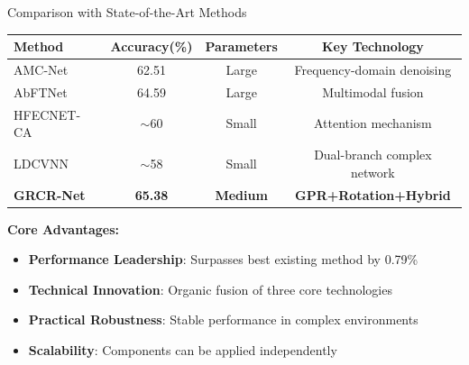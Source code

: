 \documentclass[aspectratio=169]{beamer}
\begin{document}
\begin{frame}{Comparison with State-of-the-Art Methods}
\begin{table}[h]
\centering
\scriptsize
\begin{tabular}{@{}lccc@{}}
\toprule
\textbf{Method} & \textbf{Accuracy(\%)} & \textbf{Parameters} & \textbf{Key Technology} \\
\midrule
AMC-Net & 62.51 & Large & Frequency-domain denoising \\
AbFTNet & 64.59 & Large & Multimodal fusion \\
HFECNET-CA & $\sim$60 & Small & Attention mechanism \\
LDCVNN & $\sim$58 & Small & Dual-branch complex network \\
\midrule
\textcolor{zjutred}{\textbf{GRCR-Net}} & \textcolor{zjutred}{\textbf{65.38}} & \textcolor{zjutred}{\textbf{Medium}} & \textcolor{zjutred}{\textbf{GPR+Rotation+Hybrid}} \\
\bottomrule
\end{tabular}
\end{table}

\vspace{0.5cm}
\textbf{Core Advantages:}
\begin{itemize}
\item \textcolor{zjutgreen}{\textbf{Performance Leadership}}: Surpasses best existing method by 0.79\%
\item \textcolor{zjutgreen}{\textbf{Technical Innovation}}: Organic fusion of three core technologies
\item \textcolor{zjutgreen}{\textbf{Practical Robustness}}: Stable performance in complex environments
\item \textcolor{zjutgreen}{\textbf{Scalability}}: Components can be applied independently
\end{itemize}
\end{frame}
\end{document}
